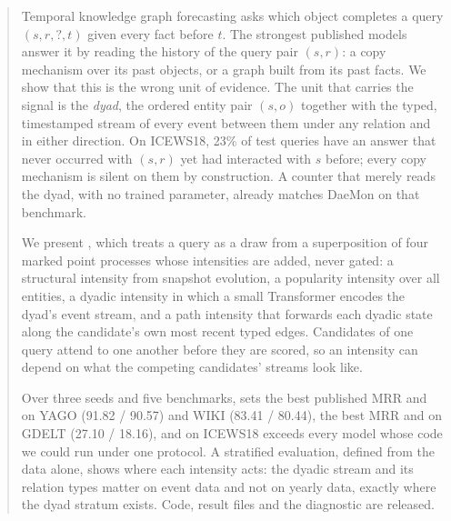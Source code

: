 \begin{abstract}
Temporal knowledge graph forecasting asks which object completes a query $(s, r, ?, t)$ given every fact before $t$. The strongest published models answer it by reading the history of the query pair $(s, r)$: a copy mechanism over its past objects, or a graph built from its past facts. We show that this is the wrong unit of evidence. The unit that carries the signal is the \emph{dyad}, the ordered entity pair $(s, o)$ together with the typed, timestamped stream of every event between them under any relation and in either direction. On ICEWS18, 23\% of test queries have an answer that never occurred with $(s, r)$ yet had interacted with $s$ before; every copy mechanism is silent on them by construction. A counter that merely reads the dyad, with no trained parameter, already matches DaeMon on that benchmark.

We present \model{}, which treats a query as a draw from a superposition of four marked point processes whose intensities are added, never gated: a structural intensity from snapshot evolution, a popularity intensity over all entities, a dyadic intensity in which a small Transformer encodes the dyad's event stream, and a path intensity that forwards each dyadic state along the candidate's own most recent typed edges. Candidates of one query attend to one another before they are scored, so an intensity can depend on what the competing candidates' streams look like.

Over three seeds and five benchmarks, \model{} sets the best published MRR and \hone{} on YAGO (91.82 / 90.57) and WIKI (83.41 / 80.44), the best MRR and \hone{} on GDELT (27.10 / 18.16), and on ICEWS18 exceeds every model whose code we could run under one protocol. A stratified evaluation, defined from the data alone, shows where each intensity acts: the dyadic stream and its relation types matter on event data and not on yearly data, exactly where the dyad stratum exists. Code, result files and the diagnostic are released.
\end{abstract}
